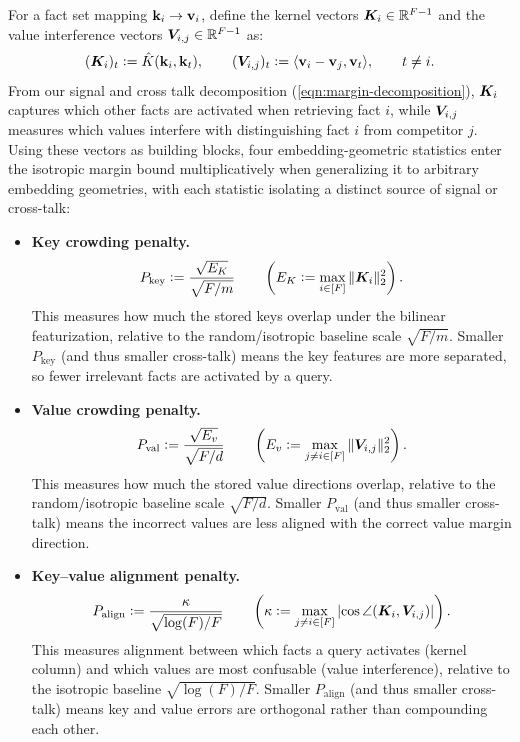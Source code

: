For a fact set mapping ${\mathbf{k}}_i \to {\mathbf{v}}_{i}$, define the kernel vectors $\boldsymbol{K}_{i}\in\mathbb R^{F-1}$ and the value interference vectors $\boldsymbol{V}_{i,j}\in\mathbb R^{F-1}$ as:
\[
(\boldsymbol{K}_{i})_t \vcentcolon= \hat{K}({\mathbf{k}}_i, {\mathbf{k}}_t),
\qquad
(\boldsymbol{V}_{i,j})_t
\vcentcolon=
\langle {\mathbf{v}}_i-{\mathbf{v}}_j,{\mathbf{v}}_t\rangle,
\qquad t\neq i.
\]
From our signal and cross talk decomposition (\cref{eqn:margin-decomposition}), $\boldsymbol{K}_i$ captures which other facts are activated when retrieving fact $i$, while $\boldsymbol{V}_{i,j}$ measures which values interfere with distinguishing fact $i$ from competitor $j$. Using these vectors as building blocks, four embedding-geometric statistics enter the isotropic margin bound multiplicatively when generalizing it to arbitrary embedding geometries, with each statistic isolating a distinct source of signal or cross-talk:
\begin{itemize}[leftmargin=0.5cm]
    \item \textbf{Key crowding penalty.}
    \[
    P_{\mathrm{key}}
    \vcentcolon=
    \frac{\sqrt{E_K}}{\sqrt{F/m}}
    \qquad
    \left(
    E_K
    \vcentcolon=
    \max_{i\in[F]}\|\boldsymbol{K}_{i}\|_2^2
    \right).
    \]
    This measures how much the stored keys overlap under the bilinear featurization,
    relative to the random/isotropic baseline scale $\sqrt{F/m}$.
    Smaller $P_{\mathrm{key}}$ (and thus smaller cross-talk) means the key features are more separated,
    so fewer irrelevant facts are activated by a query.

    \item \textbf{Value crowding penalty.}
    \[
    P_{\mathrm{val}}
    \vcentcolon=
    \frac{\sqrt{E_v}}{\sqrt{F/d}}
    \qquad
    \left(
    E_v
    \vcentcolon=
    \max_{j\neq i \in [F]}
    \|\boldsymbol{V}_{i,j}\|_2^2
    \right).
    \]
    This measures how much the stored value directions overlap,
    relative to the random/isotropic baseline scale $\sqrt{F/d}$.
    Smaller $P_{\mathrm{val}}$ (and thus smaller cross-talk) means the incorrect values are less aligned
    with the correct value margin direction.

    \item \textbf{Key--value alignment penalty.}
    \[
    P_{\mathrm{align}}
    \vcentcolon=
    \frac{\kappa}{\sqrt{\log(F)/F}}
    \qquad
    \left(
    \kappa
    \vcentcolon=
    \max_{j\neq i \in [F]}\left|\cos\angle\!\left(\boldsymbol{K}_{i},\boldsymbol{V}_{i,j}\right)\right|
    \right).
    \]
    This measures alignment between which facts a query activates (kernel column) and which values are most confusable (value interference), relative to the isotropic baseline $\sqrt{\log(F)/F}$.
    Smaller $P_{\mathrm{align}}$ (and thus smaller cross-talk) means key and value errors are orthogonal rather than compounding each other.


\end{itemize}

